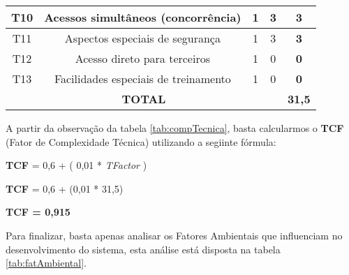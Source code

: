 \begin{table}[H]
\begin{tabular}{|c|c|c|c|c|}
			T10            & Acessos simultâneos (concorrência)           & 1             & 3              & \textbf{3}     \\ \hline
			T11            & Aspectos especiais de segurança              & 1             & 3              & \textbf{3}     \\ \hline
			T12            & Acesso direto para terceiros                 & 1             & 0              & \textbf{0}     \\ \hline
			T13            & Facilidades especiais de treinamento         & 1             & 0              & \textbf{0}     \\ \hline
			\multicolumn{4}{|c|}{\textbf{TOTAL}}                                                           & \textbf{31,5}  \\ \hline
		\end{tabular}
	\end{table}

	A partir da observação da tabela \ref{tab:compTecnica}, basta calcularmos o \textbf{TCF} (Fator de Complexidade Técnica) utilizando a segiinte fórmula:

	\begin{center}
		\textbf{TCF} = 0,6 + ( 0,01 * \textit{TFactor} )

		\textbf{TCF} = 0,6 + (0,01 * 31,5)

		\textbf{TCF = 0,915}
	\end{center}

	Para finalizar, basta apenas analisar os Fatores Ambientais que influenciam no desenvolvimento do sistema, esta análise está disposta na tabela \ref{tab:fatAmbiental}.

